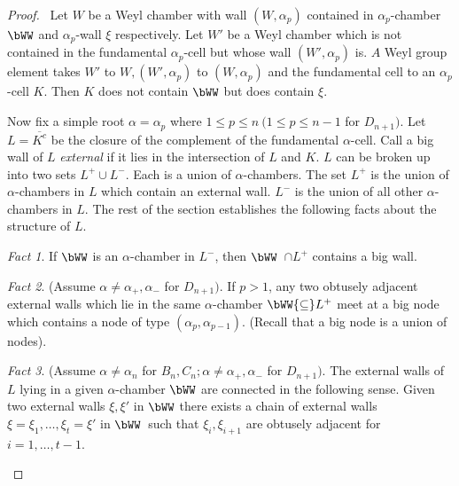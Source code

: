 \documentclass{memo-l}
\theoremstyle{definition}
\theoremstyle{remark}
\newtheorem{fact}{Fact}
\numberwithin{section}{chapter}
\numberwithin{equation}{chapter}
\begin{document}
\begin{proof} \ Let $W$ be a Weyl chamber with wall $(W,{\alpha}_{p})$
contained in ${\alpha}_{p}$-chamber $\bWW$ and ${\alpha}_{p}$-wall
${\xi}$ respectively.  Let $W'$ be a Weyl chamber which is not contained in
the fundamental ${\alpha}_{p}$-cell but whose wall $(W',{\alpha}_{p})$ is.
$A$ Weyl group element takes $W'$ to $W, (W',{\alpha}_{p})$ to
$(W,{\alpha}_{p})$ and the fundamental cell to an ${\alpha}_{p}$-cell $K$.
Then $K$ does not contain $\bWW$ but does contain ${\xi}$.

{\medskip}

   Now fix a simple root ${\alpha} = {\alpha}_{p}$ where $1 \le p \le n
\ (1 \le p \le n-1$ for $D_{n+1})$.  Let $L = \overline{K^{c}}$ be the closure
of the complement of the fundamental ${\alpha}$-cell.  Call a big wall of
$L$ {\it external} if it lies in the intersection of $L$ and $K$.  $L$ can
be broken up into two sets $L^{+} \cup L^{-}$.  Each is a
union of ${\alpha}$-chambers.  The set $L^{+}$ is the union of
${\alpha}$-chambers in $L$ which contain an external wall.  $L^-$ is the
union of all other ${\alpha}$-chambers in $L$.  The rest of the section
establishes the following facts about the structure of $L$.

\begin{fact} %
If $\bWW$ is an ${\alpha}$-chamber in
$L^-$, then $\bWW$\ $ \cap  L^{+}$ contains a big wall.
\end{fact}


\begin{fact} %
(Assume ${\alpha}\ne {\alpha}_{+},{\alpha}_{-}$ for
$D_{n+1})$.  If $p > 1$, any two obtusely adjacent external walls which lie
in the same ${\alpha}$-chamber $\bWW{\subseteq} L^{+}$ meet at a big
node which contains a node of type $({\alpha}_{p},{\alpha}_{p-1})$.
(Recall that a big node is a union of nodes).
\end{fact}

\begin{fact} %
(Assume $\alpha\ne\alpha_n$ for $B_{n},C_{n}; {\alpha} \ne
{\alpha}_{+},{\alpha}_{-}$ for $D_{n+1})$.  The external walls of $L$ lying
in a given ${\alpha}$-chamber $\bWW$ are connected in the following
sense.  Given two external walls ${\xi},{\xi}'$ in $\bWW$ there exists a
chain of external walls ${\xi} = {\xi}_{1},\ldots ,{\xi}_{t} = {\xi}'$ in
$\bWW$\  such that ${\xi}_{i},{\xi}_{i+1}$ are obtusely adjacent
for $i = 1,\ldots ,t-1$.
\end{fact}



\end{proof}
\end{document}
